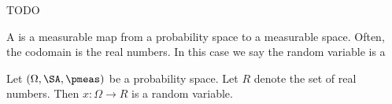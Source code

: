 
\sbasic



\sstart



TODO



A
is a measurable map
from a probability space
to a measurable space.
Often, the codomain
is the real numbers.
In this case we say
the random variable
is a


Let $(\Omega, \SA,\pmeas)$
be a probability space.
Let $R$ denote the set
of real numbers.
Then $x: \Omega \to R$
is a random variable.

\strats

